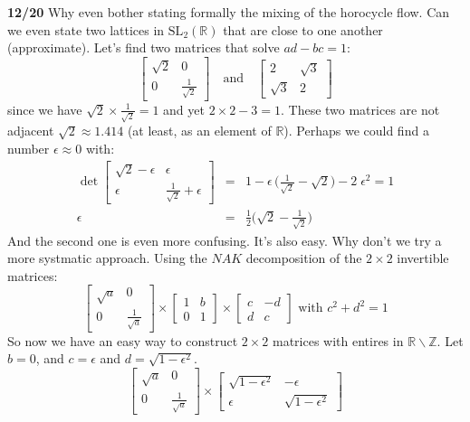 \documentclass[12pt]{article}
\begin{document}
\noindent \textbf{12/20} Why even bother stating formally the mixing of the horocycle flow.  Can we even state two lattices in $\text{SL}_2(\mathbb{R})$ that are close to one another (approximate).  Let's find two matrices that solve $ad-bc = 1$:
$$ \left[ \begin{array}{cc} \sqrt{2} & 0 \\ 0 & \frac{1}{\sqrt{2}} \end{array} \right] \quad\text{and}\quad
\left[ \begin{array}{cc} 2 & \sqrt{3} \\ \sqrt{3} & 2 \end{array} \right] $$
since we have $\sqrt{2} \times \frac{1}{\sqrt{2}} = 1$ and yet $2 \times 2 -3 = 1$.  These two matrices are not adjacent $\sqrt{2} \approx 1.414$ (at least, as an element of $\mathbb{R}$).  Perhaps we could find a number $\epsilon \approx 0$ with:
\begin{eqnarray*} \det  \left[ \begin{array}{cc} \sqrt{2}-\epsilon & \epsilon \\ \epsilon & \frac{1}{\sqrt{2} }+ \epsilon   \end{array} \right]
&=& 1 - \epsilon \, \big( \frac{1}{\sqrt{2}} - \sqrt{2} \big) - 2\;\epsilon^2 = 1 \\
\epsilon &=&  \frac{1}{2} \big( \sqrt{2} - \frac{1}{\sqrt{2}}  \big) \end{eqnarray*}
And the second one is even more confusing.  It's also easy.  Why don't we try a more systmatic approach.  Using the $NAK$ decomposition of the $2\times2$ invertible matrices:
$$
\left[ \begin{array}{cc} \sqrt{a} & 0 \\ 0 & \frac{1}{\sqrt{a}} \end{array} \right] \times
\left[ \begin{array}{cc} 1 & b \\ 0 & 1 \end{array} \right] \times
\left[ \begin{array}{rr} c & -d \\ d & c \end{array} \right] \text{ with }c^2 + d^2 =1$$
So now we have an easy way to construct $2 \times 2$ matrices with entires in $\mathbb{R} \backslash \mathbb{Z}$.  Let $b = 0$, and $c = \epsilon$ and $d = \sqrt{1 - \epsilon^2}$.  
$$ \left[ \begin{array}{cc} \sqrt{a} & 0 \\ 0 & \frac{1}{\sqrt{a}} \end{array} \right] \times
\left[ \begin{array}{rr} \sqrt{1 - \epsilon^2} & -\epsilon \\ \epsilon & \sqrt{1 - \epsilon^2} \end{array} \right] $$
\end{document}
